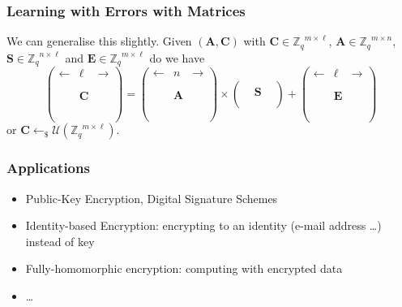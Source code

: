 \documentclass[10pt]{beamer}
\newcommand{\U}[1]{\ensuremath{\mathcal{U}(#1)\xspace}}
\renewcommand{\vec}[1]{\mathbf{#1}\xspace}
\newcommand{\Z}{\ensuremath{\mathbb{Z}}\xspace}
\newcommand{\Zq}{\ensuremath{\Z_q}\xspace}
\newcommand{\sample}{\ensuremath{\leftarrow_{\$}}}
\begin{document}
\begin{frame}
\frametitle{Learning with Errors with Matrices}
 
We can generalise this slightly. Given $(\vec{A},\vec{C})$ with $\vec{C} \in \Zq^{m \times \ell}$, $\vec{A} \in \Zq^{m \times n}$, $\vec{S} \in \Zq^{n \times \ell}$ and $\vec{E} \in \Zq^{m \times \ell}$ do we have
\[
\left(
\begin{array}{ccc}
 \leftarrow & \ell & \rightarrow \\
 \\
 \\ 
 & \vec{C} & \\
 \\
 \\
 \\
\end{array} 
\right) = \left(
\begin{array}{ccc}
 \leftarrow & n & \rightarrow \\
 \\
 \\ 
 & \vec{A} & \\
 \\
 \\
 \\
\end{array} \right) \times \left( \begin{array}{ccc}
 \\ 
 & \vec{S} & \\
 \\
\end{array} \right) + \left(
\begin{array}{ccc}
 \leftarrow & \ell & \rightarrow \\
 \\
 \\ 
 & \vec{E} & \\
 \\
 \\
 \\
\end{array} 
\right)
\]
or $\vec{C} \sample \U{\Zq^{m \times \ell}}$.

\end{frame}


\begin{frame}
\frametitle{Applications}

\begin{itemize}
\item Public-Key Encryption, Digital Signature Schemes
\item Identity-based Encryption: encrypting to an identity (e-mail address \dots) instead of key
\item Fully-homomorphic encryption: computing with encrypted data
\item \dots
\end{itemize}
\end{frame}
\end{document}
